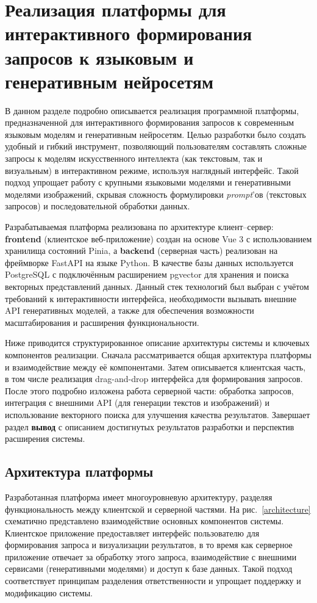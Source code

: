 \section{Реализация платформы для интерактивного формирования запросов к языковым и генеративным нейросетям}

В данном разделе подробно описывается реализация программной платформы, предназначенной для интерактивного формирования запросов к современным языковым моделям и генеративным нейросетям. Целью разработки было создать удобный и гибкий инструмент, позволяющий пользователям составлять сложные запросы к моделям искусственного интеллекта (как текстовым, так и визуальным) в интерактивном режиме, используя наглядный интерфейс. Такой подход упрощает работу с крупными языковыми моделями и генеративными моделями изображений, скрывая сложность формулировки \textit{prompt}'ов \cite{lakera:2025} (текстовых запросов) и последовательной обработки данных.

Разрабатываемая платформа реализована по архитектуре клиент--сервер: \textbf{frontend} (клиентское веб-приложение) создан на основе Vue 3 с использованием хранилища состояний Pinia, а \textbf{backend} (серверная часть) реализован на фреймворке FastAPI на языке Python\cite{fastapi:practicum}. В качестве базы данных используется PostgreSQL с подключённым расширением pgvector для хранения и поиска векторных представлений данных. Данный стек технологий был выбран с учётом требований к интерактивности интерфейса, необходимости вызывать внешние API генеративных моделей, а также для обеспечения возможности масштабирования и расширения функциональности.

Ниже приводится структурированное описание архитектуры системы и ключевых компонентов реализации. Сначала рассматривается общая архитектура платформы и взаимодействие между её компонентами. Затем описывается клиентская часть, в том числе реализация drag-and-drop интерфейса для формирования запросов. После этого подробно изложена работа серверной части: обработка запросов, интеграция с внешними API (для генерации текстов и изображений) и использование векторного поиска для улучшения качества результатов. Завершает раздел \textbf{вывод} с описанием достигнутых результатов разработки и перспектив расширения системы.

\subsection{Архитектура платформы}

Разработанная платформа имеет многоуровневую архитектуру, разделяя функциональность между клиентской и серверной частями. На рис.~\ref{architecture} схематично представлено взаимодействие основных компонентов системы. Клиентское приложение предоставляет интерфейс пользователю для формирования запроса и визуализации результатов, в то время как серверное приложение отвечает за обработку этого запроса, взаимодействие с внешними сервисами (генеративными моделями) и доступ к базе данных. Такой подход соответствует принципам разделения ответственности и упрощает поддержку и модификацию системы.

